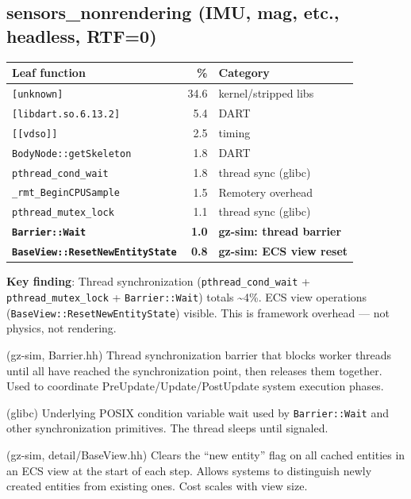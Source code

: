 \documentclass[11pt, a4paper]{article}
\begin{document}
\hypertarget{sensors_nonrendering-imu-mag-etc.-headless-rtf0}{%
\subsection{sensors\_nonrendering (IMU, mag, etc., headless,
RTF=0)}\label{sensors_nonrendering-imu-mag-etc.-headless-rtf0}}

\begin{longtable}[]{@{}lrl@{}}
\toprule\noalign{}
Leaf function & \% & Category \\
\midrule\noalign{}
\endhead
\bottomrule\noalign{}
\endlastfoot
\texttt{{[}unknown{]}} & 34.6 & kernel/stripped libs \\
\texttt{{[}libdart.so.6.13.2{]}} & 5.4 & DART \\
\texttt{{[}{[}vdso{]}{]}} & 2.5 & timing \\
\texttt{BodyNode::getSkeleton} & 1.8 & DART \\
\texttt{pthread\_cond\_wait} & 1.8 & thread sync (glibc) \\
\texttt{\_rmt\_BeginCPUSample} & 1.5 & Remotery overhead \\
\texttt{pthread\_mutex\_lock} & 1.1 & thread sync (glibc) \\
\textbf{\texttt{Barrier::Wait}} & \textbf{1.0} & \textbf{gz-sim: thread barrier} \\
\textbf{\texttt{BaseView::ResetNewEntityState}} & \textbf{0.8} & \textbf{gz-sim: ECS view reset} \\
\end{longtable}

\textbf{Key finding}: Thread synchronization
(\texttt{pthread\_cond\_wait} + \texttt{pthread\_mutex\_lock} +
\texttt{Barrier::Wait}) totals \textasciitilde4\%. ECS view operations
(\texttt{BaseView::ResetNewEntityState}) visible. This is framework
overhead --- not physics, not rendering.

\begin{description}[style=nextline, leftmargin=1.5cm]
\item[\texttt{Barrier::Wait}] (gz-sim, Barrier.hh) Thread synchronization barrier that blocks worker threads until all have reached the synchronization point, then releases them together. Used to coordinate PreUpdate/Update/PostUpdate system execution phases.
\item[\texttt{pthread\_cond\_wait}] (glibc) Underlying POSIX condition variable wait used by \texttt{Barrier::Wait} and other synchronization primitives. The thread sleeps until signaled.
\item[\texttt{BaseView::ResetNewEntityState}] (gz-sim, detail/BaseView.hh) Clears the ``new entity'' flag on all cached entities in an ECS view at the start of each step. Allows systems to distinguish newly created entities from existing ones. Cost scales with view size.
\end{description}
\end{document}
